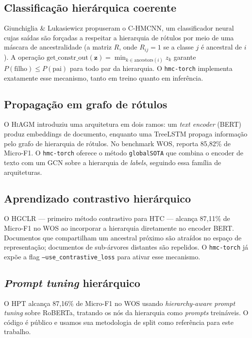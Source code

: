 \documentclass[11pt,a4paper,twoside]{article}
\begin{document}
\subsection{Classificação hierárquica coerente}

Giunchiglia \& Lukasiewicz \cite{giunchiglia2020coherent} propuseram o
\textsc{C-HMCNN}, um classificador neural cujas saídas são forçadas a respeitar a
hierarquia de rótulos por meio de uma máscara de ancestralidade (a matriz $R$, onde
$R_{ij}=1$ se a classe $j$ é ancestral de $i$). A operação
$\text{get\_constr\_out}(\mathbf{z}) = \min_{k \in \text{ancestors}(i)} z_k$
garante $P(\text{filho}) \leq P(\text{pai})$ para todo par da hierarquia.
O \texttt{hmc-torch} implementa exatamente esse mecanismo, tanto em treino quanto em
inferência.

\subsection{Propagação em grafo de rótulos}

O \textsc{HiAGM} \cite{zhou2020hiagm} introduziu uma arquitetura em dois ramos:
um \textit{text encoder} (BERT) produz embeddings de documento, enquanto uma
TreeLSTM propaga informação pelo grafo de hierarquia de rótulos. No benchmark WOS,
reporta 85,82\% de Micro-F1. O \texttt{hmc-torch} oferece o método
\texttt{globalSOTA} que combina o encoder de texto com um GCN sobre a hierarquia de
\textit{labels}, seguindo essa família de arquiteturas.

\subsection{Aprendizado contrastivo hierárquico}

O \textsc{HGCLR} \cite{wang2022hgclr} --- primeiro método contrastivo para HTC ---
alcança 87,11\% de Micro-F1 no WOS ao incorporar a hierarquia diretamente no encoder
BERT. Documentos que compartilham um ancestral próximo são atraídos no espaço de
representação; documentos de sub-árvores distantes são repelidos. O \texttt{hmc-torch}
já expõe a flag \texttt{--use\_contrastive\_loss} para ativar esse mecanismo.

\subsection{\textit{Prompt tuning} hierárquico}

O \textsc{HPT} \cite{wang2022hpt} alcança 87,16\% de Micro-F1 no WOS usando
\textit{hierarchy-aware prompt tuning} sobre RoBERTa, tratando os nós da hierarquia
como \textit{prompts} treináveis. O código é público e usamos sua metodologia de split
como referência para este trabalho.
\end{document}
